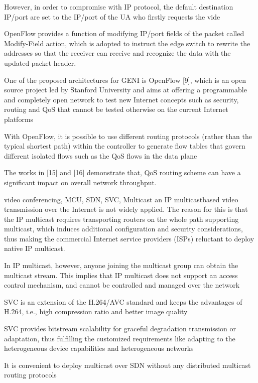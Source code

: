 \documentclass[a4paper, 10pt, conference]{ieeeconf}
\begin{document}
However, in order to compromise with IP
protocol, the default destination IP/port are set to the
IP/port of the UA who firstly requests the vide

OpenFlow provides a
function of modifying IP/port fields of the packet called
Modify-Field action, which is adopted to instruct the
edge switch to rewrite the addresses so that the receiver
can receive and recognize the data with the updated
packet header.

\cite{civanlar2010qos}
One of the proposed architectures for GENI is
OpenFlow [9], which is an open source project led by Stanford
University and aims at offering a programmable and
completely open network to test new Internet concepts such as
security, routing and QoS that cannot be tested otherwise on
the current Internet platforms

With OpenFlow, it is possible to use different routing
protocols (rather than the typical shortest path) within the
controller to generate flow tables that govern different isolated
flows such as the QoS flows in the data plane

The works in [15] and [16] demonstrate that, QoS routing
scheme can have a significant impact on overall network
throughput.

\cite{yang2016video}
video conferencing, MCU, SDN, SVC, Multicast
an IP multicastbased
video transmission over the Internet is not
widely applied. The reason for this is that the IP
multicast requires transporting routers on the whole
path supporting multicast, which induces additional
configuration and security considerations, thus making
the commercial Internet service providers (ISPs)
reluctant to deploy native IP multicast.

In IP multicast, however,
anyone joining the multicast group can obtain
the multicast stream. This implies that IP multicast
does not support an access control mechanism, and
cannot be controlled and managed over the network

SVC is an extension of the
H.264/AVC standard and keeps the advantages of
H.264, i.e., high compression ratio and better image
quality

SVC provides bitstream
scalability for graceful degradation transmission
or adaptation, thus fulfilling the customized requirements
like adapting to the heterogeneous device
capabilities and heterogeneous networks

It is convenient to deploy multicast
over SDN without any distributed multicast
routing protocols
\end{document}
